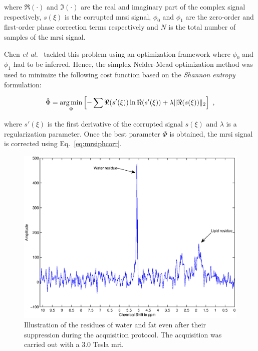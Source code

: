 \begin{enumerate}[leftmargin=*]
\noindent where $\Re(\cdot)$ and $\Im(\cdot)$ are the real and imaginary part of the complex signal respectively, $s(\xi)$ is the corrupted \ac{mrsi} signal, $\phi_0$ and $\phi_1$ are the zero-order and first-order phase correction terms respectively and $N$ is the total number of samples of the \ac{mrsi} signal.

Chen \textit{et al.}~\cite{Chen2002} tackled this problem using an optimization framework where $\phi_0$ and $\phi_1$ had to be inferred.
Hence, the simplex Nelder-Mead optimization method was used to minimize the following cost function based on the \textit{Shannon entropy} formulation:

\begin{equation}
	\hat{\Phi} = \argmin_{\Phi} \left[ - \sum \Re(s'(\xi)) \ln \Re(s'(\xi)) + \lambda \|\Re(s(\xi))\|_2 \right] \ ,
	\label{eq:phcost}
\end{equation}

\noindent where $s'(\xi)$ is the first derivative of the corrupted signal $s(\xi)$ and $\lambda$ is a regularization parameter.
Once the best parameter $\Phi$ is obtained, the \ac{mrsi} signal is corrected using Eq.~\eqref{eq:mrsiphcorr}.

\begin{figure}
\centering
	\includegraphics[width=0.7\linewidth]{3_review/figures/processing/pre-processing/water/water_fat.eps}
	\caption[Illustration of water and fat residues in \ac{mrsi} signal after supression during acquisition.]{Illustration of the residues of water and fat even after their suppression during the acquisition protocol. The acquisition was carried out with a 3.0 Tesla \ac{mri}.}
	\label{fig:waterfat}
\end{figure}


\end{enumerate}
